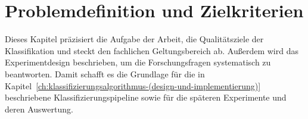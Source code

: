 \chapter{Problemdefinition und Zielkriterien}\label{ch:problemdefinition-und-zielkriterien}

Dieses Kapitel präzisiert die Aufgabe der Arbeit, die Qualitätsziele der Klassifikation und steckt den fachlichen Geltungsbereich ab. Außerdem wird das Experimentdesign beschrieben, um die Forschungsfragen systematisch zu beantworten. Damit schafft es die Grundlage für die in Kapitel~\ref{ch:klassifizierungsalgorithmus-(design-und-implementierung)} beschriebene Klassifizierungspipeline sowie für die späteren Experimente und deren Auswertung.





